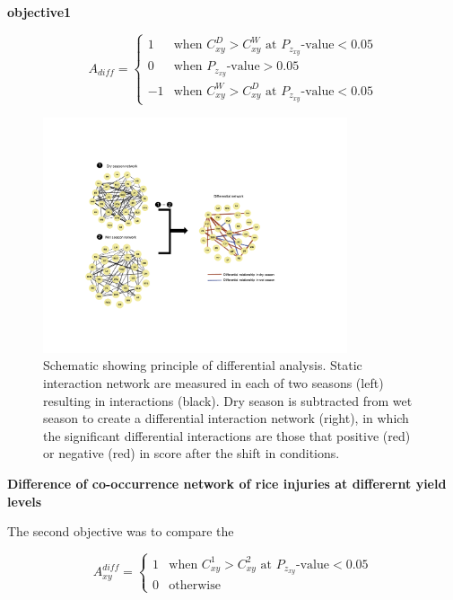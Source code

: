 \textbf{objective1}

\begin{equation}
A_{diff} = \left\{\begin{matrix}
 1 & \text{when } C_{xy}^D > C_{xy}^W \text{ at } P_{z_{xy}} \text{-value}  < 0.05  \\ 
 0 & \text{when } P_{z_{xy}}  \text{-value}  > 0.05                              \\ 
-1 & \text{when } C_{xy}^W > C_{xy}^D \text{ at } P_{z_{xy}} \text{-value}  < 0.05 
\end{matrix}\right.
\end{equation}


\begin{figure}
\centering
\includegraphics[width = 0.8\textwidth]{figures/pipeline3.pdf}
\caption{Schematic showing principle of differential analysis. Static interaction network are measured in each of two seasons (left) resulting in interactions (black). Dry season is subtracted from wet season to create a differential interaction network (right), in which the significant differential interactions are those that positive (red) or negative (red) in score after the shift in conditions.}
\label{fig:pipeline3}
\end{figure} 

\textbf{Difference of co-occurrence network of rice injuries at differernt yield levels}

The second objective was to compare the 

\begin{equation}
A_{xy}^{diff} = \left\{\begin{matrix}
 1 & \text{when } C_{xy}^1 > C_{xy}^2 \text{ at } P_{z_{xy}} \text{-value}  < 0.05  \\ 
 0 & \text{otherwise}                             
\end{matrix}\right.
\end{equation}


